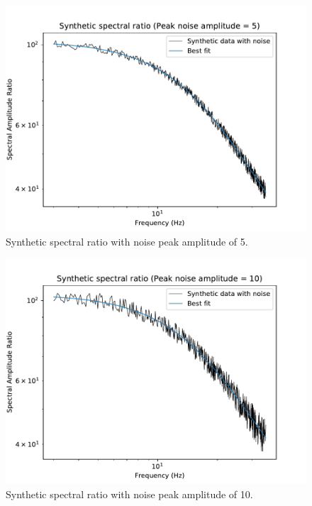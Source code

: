 \documentclass[11pt]{article}
\begin{document}
\begin{figure}[!htb]
    \centering
    \includegraphics[scale=0.7]{fig_freq_noise_1.pdf}
    \caption{Synthetic spectral ratio with noise peak amplitude of 5.}
\end{figure}
\begin{figure}[!htb]
    \centering
    \includegraphics[scale=0.7]{fig_freq_noise_2.pdf}
    \caption{Synthetic spectral ratio with noise peak amplitude of 10.}
\end{figure}
\end{document}
